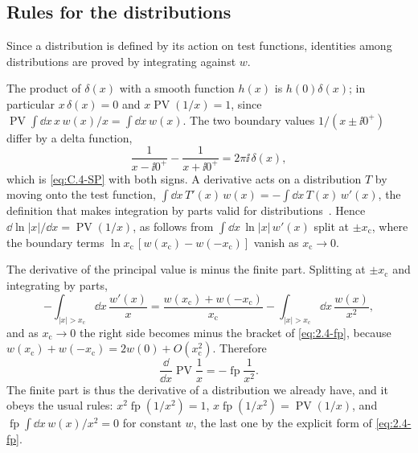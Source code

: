 \subsection{Rules for the distributions}

Since a distribution is defined by its action on test functions, identities among distributions are proved by integrating against $w$.

The product of $\delta(x)$ with a smooth function $h(x)$ is $h(0)\delta(x)$; in particular $x\,\delta(x) = 0$ and $x\operatorname{PV}(1/x) = 1$, since $\operatorname{PV}\!\int\dd x\,x\,w(x)/x = \int\dd x\,w(x)$. The two boundary values $1/(x \pm \ii0^+)$ differ by a delta function,
\begin{equation}
  \frac{1}{x - \ii0^+} - \frac{1}{x + \ii0^+} = 2\pi\ii\,\delta(x) ,
  \label{eq:C.4-difference}
\end{equation}
which is \cref{eq:C.4-SP} with both signs. A derivative acts on a distribution $T$ by moving onto the test function, $\int\dd x\,T'(x)\,w(x) = -\int\dd x\,T(x)\,w'(x)$, the definition that makes integration by parts valid for distributions~\cite[Eq.~(1.16.8)]{olver2010nist}. Hence $\dd\ln|x|/\dd x = \operatorname{PV}(1/x)$, as follows from $\int\dd x\,\ln|x|\,w'(x)$ split at $\pm x_{\mathrm{c}}$, where the boundary terms $\ln x_{\mathrm{c}}\,[w(x_{\mathrm{c}}) - w(-x_{\mathrm{c}})]$ vanish as $x_{\mathrm{c}}\to0$.

The derivative of the principal value is minus the finite part. Splitting at $\pm x_{\mathrm{c}}$ and integrating by parts,
\begin{equation*}
  -\int_{|x| > x_{\mathrm{c}}}\dd x\,\frac{w'(x)}{x} = \frac{w(x_{\mathrm{c}}) + w(-x_{\mathrm{c}})}{x_{\mathrm{c}}} - \int_{|x| > x_{\mathrm{c}}}\dd x\,\frac{w(x)}{x^2} ,
\end{equation*}
and as $x_{\mathrm{c}}\to0$ the right side becomes minus the bracket of \cref{eq:2.4-fp}, because $w(x_{\mathrm{c}}) + w(-x_{\mathrm{c}}) = 2w(0) + O(x_{\mathrm{c}}^2)$. Therefore
\begin{equation}
  \frac{\dd}{\dd x}\operatorname{PV}\frac1x = -\operatorname{fp}\frac{1}{x^2} .
  \label{eq:C.4-dPV}
\end{equation}
The finite part is thus the derivative of a distribution we already have, and it obeys the usual rules: $x^2\operatorname{fp}(1/x^2) = 1$, $x\operatorname{fp}(1/x^2) = \operatorname{PV}(1/x)$, and $\operatorname{fp}\!\int\dd x\,w(x)/x^2 = 0$ for constant $w$, the last one by the explicit form of \cref{eq:2.4-fp}.

